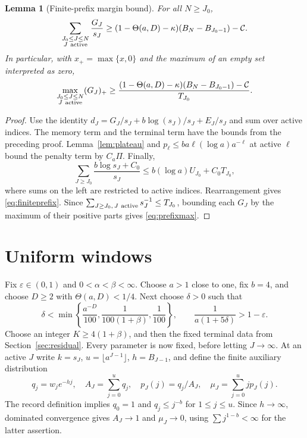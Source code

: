\documentclass[11pt]{amsart}
\newtheorem{lemma}[theorem]{Lemma}
\theoremstyle{remark}\newtheorem{remark}[theorem]{Remark}
\begin{document}
\begin{lemma}[Finite-prefix margin bound]\label{lem:prefix}
For all $N\ge J_0$,
\begin{equation}\label{eq:finiteprefix}
 \sum_{\substack{J_0\le J\le N\\J\ {\rm active}}}\frac{G_J}{s_J}
 \ge(1-\Theta(a,D)-\kappa)(B_N-B_{J_0-1})-\mathcal C.
\end{equation}
In particular, with $x_+=\max\{x,0\}$ and the maximum of an empty set
interpreted as zero,
\begin{equation}\label{eq:prefixmax}
 \max_{\substack{J_0\le J\le N\\J\ {\rm active}}}(G_J)_+
 \ge\frac{(1-\Theta(a,D)-\kappa)(B_N-B_{J_0-1})-\mathcal C}{T_{J_0}}.
\end{equation}
\end{lemma}

\begin{proof}
Use the identity
$d_J=G_J/s_J+b\log(s_J)/s_J+E_J/s_J$ and sum over active indices.
The memory term and the terminal term have the bounds from the preceding
proof. Lemma~\ref{lem:plateau} and
$p_\ell\le ba\ell(\log a)a^{-\ell}$ at active $\ell$ bound the penalty
term by $C_a\Pi$. Finally,
\[
 \sum_{J\ge J_0}\frac{b\log s_J+C_0}{s_J}
 \le b(\log a)U_{J_0}+C_0T_{J_0},
\]
where sums on the left are restricted to active indices. Rearrangement
gives \eqref{eq:finiteprefix}. Since
$\sum_{J\ge J_0,\,J\ {\rm active}}s_J^{-1}\le T_{J_0}$, bounding each
$G_J$ by the maximum of their positive parts gives \eqref{eq:prefixmax}.
\end{proof}

\section{Uniform windows}\label{sec:windows}
Fix $\varepsilon\in(0,1)$ and $0<\alpha<\beta<\infty$. Choose $a>1$ close
to one, fix $b=4$, and choose $D\ge2$ with $\Theta(a,D)<1/4$. Next choose
$\delta>0$ such that
\begin{equation}\label{eq:parameters}
 \delta<\min\left\{\frac{a^{-D}}{100},\frac1{100(1+\beta)},\frac1{100}\right\},
 \qquad \frac1{a(1+5\delta)}>1-\varepsilon.
\end{equation}
Choose an integer $K\ge4(1+\beta)$, and then the fixed terminal data from
Section~\ref{sec:residual}. Every parameter is now fixed, before letting $J\to\infty$.
At an active $J$ write $k=s_J$, $u=\lfloor a^{J-1}\rfloor$, $h=B_{J-1}$,
and define the finite auxiliary distribution
\begin{equation}\label{eq:auxiliary}
 q_j=w_je^{-hj},\quad A_J=\sum_{j=0}^{u}q_j,\quad
 p_J(j)=q_j/A_J,\quad \mu_J=\sum_{j=0}^{u}j p_J(j).
\end{equation}
The record definition implies $q_0=1$ and $q_j\le j^{-b}$ for $1\le j\le u$.
Since $h\to\infty$, dominated convergence gives $A_J\to1$ and $\mu_J\to0$,
using $\sum j^{1-b}<\infty$ for the latter assertion.
\end{document}
